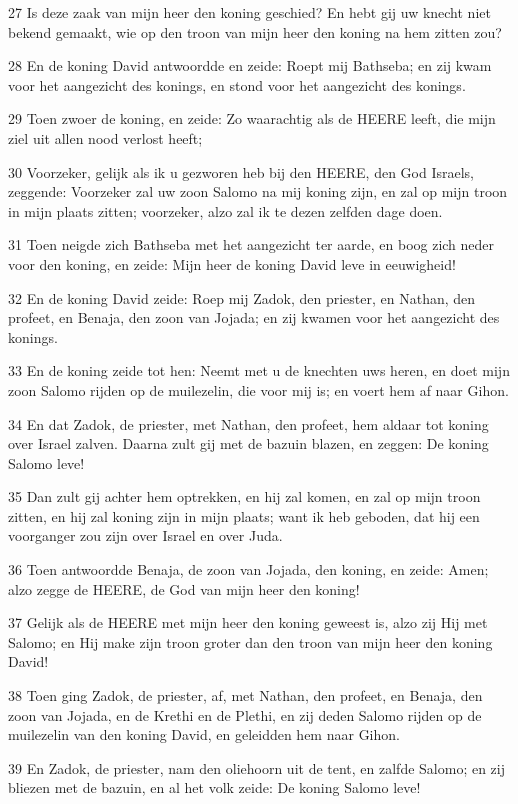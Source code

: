 \par 27 Is deze zaak van mijn heer den koning geschied? En hebt gij uw knecht niet bekend gemaakt, wie op den troon van mijn heer den koning na hem zitten zou?
\par 28 En de koning David antwoordde en zeide: Roept mij Bathseba; en zij kwam voor het aangezicht des konings, en stond voor het aangezicht des konings.
\par 29 Toen zwoer de koning, en zeide: Zo waarachtig als de HEERE leeft, die mijn ziel uit allen nood verlost heeft;
\par 30 Voorzeker, gelijk als ik u gezworen heb bij den HEERE, den God Israels, zeggende: Voorzeker zal uw zoon Salomo na mij koning zijn, en zal op mijn troon in mijn plaats zitten; voorzeker, alzo zal ik te dezen zelfden dage doen.
\par 31 Toen neigde zich Bathseba met het aangezicht ter aarde, en boog zich neder voor den koning, en zeide: Mijn heer de koning David leve in eeuwigheid!
\par 32 En de koning David zeide: Roep mij Zadok, den priester, en Nathan, den profeet, en Benaja, den zoon van Jojada; en zij kwamen voor het aangezicht des konings.
\par 33 En de koning zeide tot hen: Neemt met u de knechten uws heren, en doet mijn zoon Salomo rijden op de muilezelin, die voor mij is; en voert hem af naar Gihon.
\par 34 En dat Zadok, de priester, met Nathan, den profeet, hem aldaar tot koning over Israel zalven. Daarna zult gij met de bazuin blazen, en zeggen: De koning Salomo leve!
\par 35 Dan zult gij achter hem optrekken, en hij zal komen, en zal op mijn troon zitten, en hij zal koning zijn in mijn plaats; want ik heb geboden, dat hij een voorganger zou zijn over Israel en over Juda.
\par 36 Toen antwoordde Benaja, de zoon van Jojada, den koning, en zeide: Amen; alzo zegge de HEERE, de God van mijn heer den koning!
\par 37 Gelijk als de HEERE met mijn heer den koning geweest is, alzo zij Hij met Salomo; en Hij make zijn troon groter dan den troon van mijn heer den koning David!
\par 38 Toen ging Zadok, de priester, af, met Nathan, den profeet, en Benaja, den zoon van Jojada, en de Krethi en de Plethi, en zij deden Salomo rijden op de muilezelin van den koning David, en geleidden hem naar Gihon.
\par 39 En Zadok, de priester, nam den oliehoorn uit de tent, en zalfde Salomo; en zij bliezen met de bazuin, en al het volk zeide: De koning Salomo leve!
